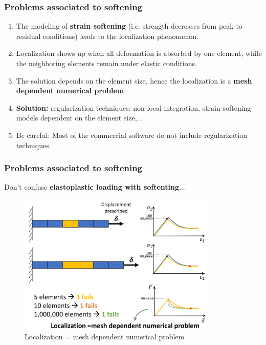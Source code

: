 \documentclass[notes]{beamer}
\begin{document}
\begin{frame}
\frametitle{Problems associated to softening}
\begin{enumerate}
	\item The modeling of \textbf{strain softening} (i.e. strength decreases from peak to residual conditions) leads to the localization
	phenomenon.
	\item Localization shows up when all deformation is absorbed by one element, while the neighboring elements remain under elastic conditions.
	\item The solution depends on the element size, hence the localization is a \textbf{mesh dependent numerical problem}.
	\item \textbf{Solution: }regularization techniques:  non‐local integration, strain softening models dependent on the element size,...
	\item Be careful: Most of the commercial software do not include regularization techniques.
\end{enumerate}
\end{frame}


\begin{frame}
\frametitle{Problems associated to softening}
Don't confuse \textbf{elastoplastic loading with softenting}...
\begin{figure}
	\includegraphics[width=0.85\textwidth]{figs/localization.png}
	\caption*{Localization = mesh dependent numerical problem}
\end{figure}
\end{frame}
\end{document}
